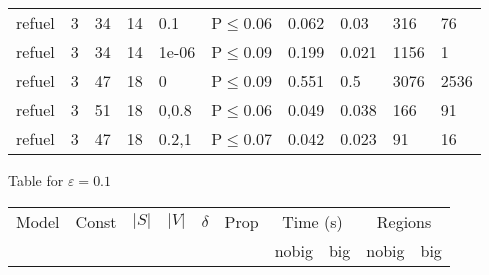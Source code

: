 \begin{longtable}{llrrllllll}
 refuel        & 3         &     	34 &   14 & 0.1   & P$\leq$0.06  & 0.062   & 0.03     & 316    & 76     \\
 refuel        & 3         &     	34 &   14 & 1e-06 & P$\leq$0.09  & 0.199   & 0.021    & 1156   & 1      \\
 refuel        & 3         &     	47 &   18 & 0     & P$\leq$0.09  & 0.551   & 0.5      & 3076   & 2536   \\
 refuel        & 3         &     	51 &   18 & 0,0.8 & P$\leq$0.06  & 0.049   & 0.038    & 166    & 91     \\
 refuel        & 3         &     	47 &   18 & 0.2,1 & P$\leq$0.07  & 0.042   & 0.023    & 91     & 16     \\
\bottomrule
\end{longtable}
\small Table for \(\varepsilon=0.1\)
\begin{longtable}{llrrllllll}

        \toprule
        Model & Const & $|S|$ & $|V|$ & $\delta$ & Prop & \multicolumn{2}{c}{Time (s)} & \multicolumn{2}{c}{Regions} \\
        \cmidrule(ll){7-8} \cmidrule(ll){9-10}
        & & & & & & nobig & big & nobig & big \\
        \midrule
        

\end{longtable}
